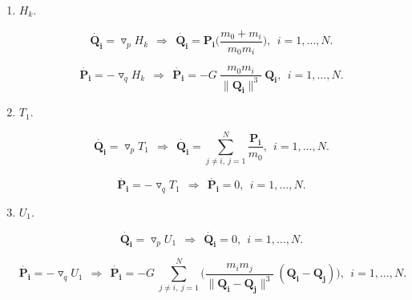 \begin{enumerate}
\item $H_k$.

\begin{equation*}
\dot{\mathbf{Q_i}}= \triangledown_p H_k \ \ \Rightarrow \ \  \dot{\mathbf{Q_i}}=\mathbf{P_i}\big(\frac{m_0+m_i}{m_0m_i}\big), \ \ i=1,\dots, N.
\end{equation*}

\begin{equation*}
\dot{\mathbf{P_i}}= -\triangledown_q H_k \ \ \Rightarrow \ \  \dot{\mathbf{P_i}}= - G  \ \frac{m_0m_i}{\|\mathbf{Q_i}\|^3 }\ \mathbf{Q_i}, \ \ i=1,\dots, N.
\end{equation*}

\item $T_1$.

\begin{equation*}
\dot{\mathbf{Q_i}}= \triangledown_p T_1 \ \ \Rightarrow \ \  \dot{\mathbf{Q_i}}=\sum\limits_{j\ne i,\ j=1}^{N} \frac{\mathbf{P_i}}{m_0}, \ \ i=1,\dots, N.
\end{equation*}

\begin{equation*}
\dot{\mathbf{P_i}}= -\triangledown_q T_1 \ \ \Rightarrow \ \  \dot{\mathbf{P_i}}= 0, \ \ i=1,\dots, N.
\end{equation*}

\item $U_1$.

\begin{equation*}
\dot{\mathbf{Q_i}}= \triangledown_p U_1 \ \ \Rightarrow \ \  \dot{\mathbf{Q_i}}=0, \ \ i=1,\dots, N.
\end{equation*}

\begin{equation*}
\dot{\mathbf{P_i}}= -\triangledown_q U_1 \ \ \Rightarrow \ \ 
 \dot{\mathbf{P_i}}= -G \ \sum\limits_{j \ne i , \ j=1}^{N} \bigg(\frac{m_im_j}{\|\mathbf{Q_i}-\mathbf{Q_j}\|^3} \ (\mathbf{Q_i-\mathbf{Q_j}}) \bigg), \ \ i=1,\dots, N.
\end{equation*}

\end{enumerate}



